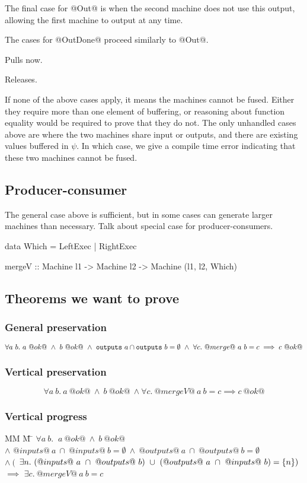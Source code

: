 The final case for @Out@ is when the second machine does not use this output, allowing the first machine to output at any time.

The cases for @OutDone@ proceed similarly to @Out@.

Pulls now.

Releases.

If none of the above cases apply, it means the machines cannot be fused.
Either they require more than one element of buffering, or reasoning about function equality would be required to prove that they do not.
The only unhandled cases above are where the two machines share input or outputs, and there are existing values buffered in $\psi$.
In which case, we give a compile time error indicating that these two machines cannot be fused.




\subsection{Producer-consumer}
The general case above is sufficient, but in some cases can generate larger machines than necessary.
Talk about special case for producer-consumers.

\begin{code}
data Which = LeftExec | RightExec

mergeV :: Machine l1 -> Machine l2
       -> Machine (l1, l2, Which)
\end{code}

\subsection{Theorems we want to prove}
\subsubsection{General preservation}
$$
\forall a~b.\ a~@ok@~\wedge~b~@ok@~\wedge~\outputs{a} \cap \outputs{b} = \emptyset ~\wedge~ \forall c.\ @merge@~a~b = c \implies c~@ok@
$$

\subsubsection{Vertical preservation}
$$
\forall a~b.\ a~@ok@~\wedge~b~@ok@~\wedge \forall c.\ @mergeV@~a~b = c \implies c~@ok@
$$

\subsubsection{Vertical progress}
\begin{tabbing}
MM \= M \= \kill
$ \forall a~b.\ $ \> \>
$a~@ok@~\wedge~b~@ok@$ \\
\> $\wedge$ \> $@inputs@~a~\cap~@inputs@~b=\emptyset~\wedge~@outputs@~a~\cap~@outputs@~b=\emptyset$ \\
\> $\wedge~($ \> $\exists n.\ (@inputs@~a~\cap~@outputs@~b)~\cup~(@outputs@~a~\cap~@inputs@~b) = \sgl{n})$ \\
 $\implies$ \> \> $\exists c.\ @mergeV@~a~b=c$
\end{tabbing}


